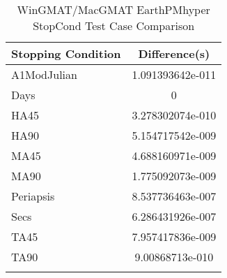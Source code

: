 \begin{table}[htbp!]
\centering
\caption{ WinGMAT/MacGMAT EarthPMhyper StopCond Test Case Comparison}
      \begin{tabular}{lc}
      \hline\hline
          Stopping Condition & Difference(s) \\
         \hline
         A1ModJulian & 1.091393642e-011 \\
         Days & 0 \\
         HA45 & 3.278302074e-010 \\
         HA90 & 5.154717542e-009 \\
         MA45 & 4.688160971e-009 \\
         MA90 & 1.775092073e-009 \\
         Periapsis & 8.537736463e-007 \\
         Secs & 6.286431926e-007 \\
         TA45 & 7.957417836e-009 \\
         TA90 & 9.00868713e-010 \\
      \hline\hline
      \label{Table: WinGMAT-MacGMAT EarthPMhyper StopCond Table} 
\end{tabular}
\end{table}
